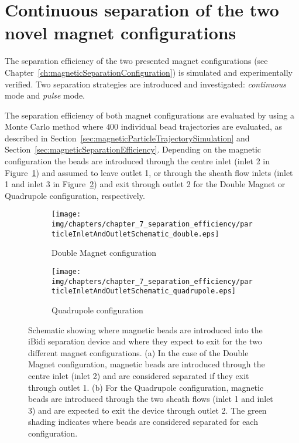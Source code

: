 \section{Continuous separation of the two novel magnet configurations}
\label{sec:continuousMagneticSeparationEfficiencyOfTheTwoNovelMagnetConfigurations}
The separation efficiency of the two presented magnet configurations (see Chapter~\ref{ch:magneticSeparationConfiguration}) is simulated and experimentally verified. Two separation strategies are introduced and investigated: \textit{continuous} mode and \textit{pulse} mode. 

The separation efficiency of both magnet configurations are evaluated by using a Monte Carlo method where $400$ individual bead trajectories are evaluated, as described in Section~\ref{sec:magneticParticleTrajectorySimulation} and Section~\ref{sec:magneticSeparationEfficiency}. Depending on the magnetic configuration the beads are introduced through the centre inlet (inlet 2 in Figure~\ref{fig:particleInletAndOutletSchematic_double}) and assumed to leave outlet 1, or through the sheath flow inlets (inlet 1 and inlet 3 in Figure~\ref{fig:particleInletAndOutletSchematic_quadrupole}) and exit through outlet 2 for the Double Magnet or Quadrupole configuration, respectively. 

\begin{figure}[htb]
	\centering
    \begin{subfigure}[b]{0.48\textwidth}
	    \centering
        \texttt{[image: img/chapters/chapter\_7\_separation\_efficiency/particleInletAndOutletSchematic\_double.eps]}
        \caption{Double Magnet configuration}
        \label{fig:particleInletAndOutletSchematic_double}
    \end{subfigure}
    \hfill
    \begin{subfigure}[b]{0.48\textwidth}
	    \centering
        \texttt{[image: img/chapters/chapter\_7\_separation\_efficiency/particleInletAndOutletSchematic\_quadrupole.eps]}
        \caption{Quadrupole configuration}
        \label{fig:particleInletAndOutletSchematic_quadrupole}
    \end{subfigure}
\caption[Particle inlet and outlet schematic]{Schematic showing where magnetic beads are introduced into the iBidi separation device and where they expect to exit for the two different magnet configurations. (a) In the case of the Double Magnet configuration, magnetic beads are introduced through the centre inlet (inlet 2) and are considered separated if they exit through outlet 1. (b) For the Quadrupole configuration, magnetic beads are introduced through the two sheath flows (inlet 1 and inlet 3) and are expected to exit the device through outlet 2. The green shading indicates where beads are considered separated for each configuration.}
\label{fig:particleInletAndOutletSchematic}
\end{figure}

